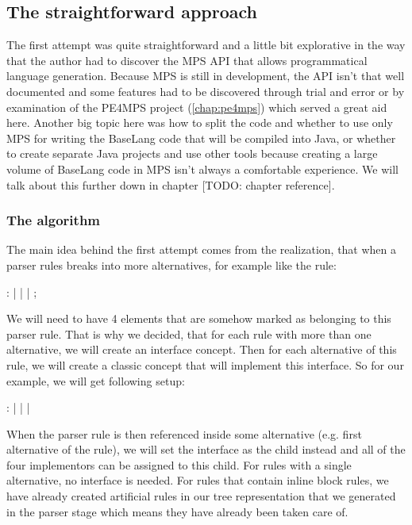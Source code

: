\subsection{The straightforward approach}
\label{chap:straightforward_approach}

The first attempt was quite straightforward and a little bit explorative in the way that the author had to discover the MPS API that allows programmatical language generation. Because MPS is still in development, the API isn't that well documented and some features had to be discovered through trial and error or by examination of the PE4MPS project (\ref{chap:pe4mps}) which served a great aid here. Another big topic here was how to split the code and whether to use only MPS for writing the BaseLang code that will be compiled into Java, or whether to create separate Java projects and use other tools because creating a large volume of BaseLang code in MPS isn't always a comfortable experience. We will talk about this further down in chapter [TODO: chapter reference].

\subsubsection{The algorithm}
\label{chap:straight_algorithm}
The main idea behind the first attempt comes from the realization, that when a parser rules breaks into more alternatives, for example like the  rule:

\begin{antlr}
	    :   
           |   
           |   
           |   
           ;
\end{antlr}  

We will need to have 4 elements that are somehow marked as belonging to this parser rule. That is why we decided, that for each rule with more than one alternative, we will create an interface concept. Then for each alternative of this rule, we will create a classic concept that will implement this interface. So for our  example, we will get following setup:

\begin{antlr}
	   :   
           |   
           |   
           |   
\end{antlr}

When the  parser rule is then referenced inside some alternative (e.g. first alternative of the  rule), we will set the  interface as the child instead and all of the four implementors can be assigned to this child. For rules with a single alternative, no interface is needed. For rules that contain inline block rules, we have already created artificial rules in our tree representation that we generated in the parser stage which means they have already been taken care of.

